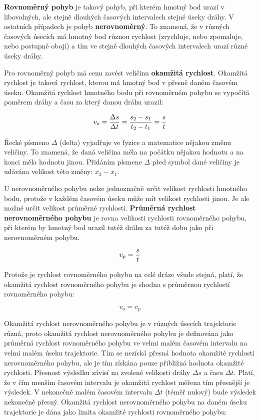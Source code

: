 

{\bf Rovnoměrný pohyb} je takový pohyb, při kterém hmotný bod urazí v libovolných, ale stejně dlouhých časových intervalech stejné úseky dráhy. V ostatních případech je pohyb {\bf nerovnoměrný}. To znamená, že v různých časových úsecích má hmotný bod různou rychlost (zrychluje, nebo zpomaluje, nebo postupně obojí) a tím ve stejně dlouhých časových intervalech urazí různé úseky dráhy.

Pro rovnoměrný pohyb má cenu zavést veličinu {\bf okamžitá rychlost}. Okamžitá rychlost je taková rychlost, kterou má hmotný bod v přesně daném časovém úseku. Okamžitá rychlost hmotného bodu při rovnoměrném pohybu se vypočítá poměrem dráhy a času za který danou dráhu urazil:

$$ v_o = {\Delta s \over \Delta t} = {{s_2 - s_1} \over {t_2 - t_1}}= {s \over t} $$

Řecké písmeno $\Delta$ (delta) vyjadřuje ve fyzice a matematice nějakou změnu veličiny. To znamená, že daná veličina měla na počátku nějakou hodnotu a na konci měla hodnotu jinou. Přidáním písmene $\Delta$ před symbol dané veličiny je udávána velikost této změny: $x_2 - x_1$.

U nerovnoměrného pohybu nelze jednoznačně určit velikost rychlosti hmotného bodu, protože v každém časovém úseku může mít velikost rychlosti  jinou. Je ale možné určit velikost průměrné rychlosti. {\bf Průměrná rychlost nerovnoměrného pohybu} je rovna velikosti rychlosti rovnoměrného pohybu, při kterém by hmotný bod urazil tutéž dráhu za tutéž dobu jako při nerovnoměrném pohybu.

$$ v_p = {s \over t} $$

Protože je rychlost rovnoměrného pohybu na celé dráze všude stejná, platí, že okamžitá rychlost rovnoměrného pohybu je shodna s průměrnou rychlostí rovnoměrného pohybu:

$$ v_o = v_p $$

Okamžitá rychlost nerovnoměrného pohybu je v různých úsecích trajektorie různá, proto okamžitá rychlost nerovnoměrného pohybu je definována jako průměrná rychlost rovnoměrného pohybu ve velmi malém časovém intervalu na velmi malém úseku trajektorie. Tím se nezíská přesná hodnota okamžité rychlosti nerovnoměrného pohybu, ale je tím získána pouze přibližná hodnota okamžité rychlosti. Přesnost výsledku závisí na zvolené velikosti dráhy $\Delta s$ a času $\Delta t$. Platí, že v čím menším časovém intervalu je okamžitá rychlost měřena tím přesnější je výsledek. V nekonečně malém časovém intervalu $\Delta t$ (téměř nulový) bude výsledek nekonečně přesný. Okamžitá rychlost nerovnoměrného pohybu na daném úseku trajektorie je dána jako limita okamžité rychlosti rovnoměrného pohybu:

